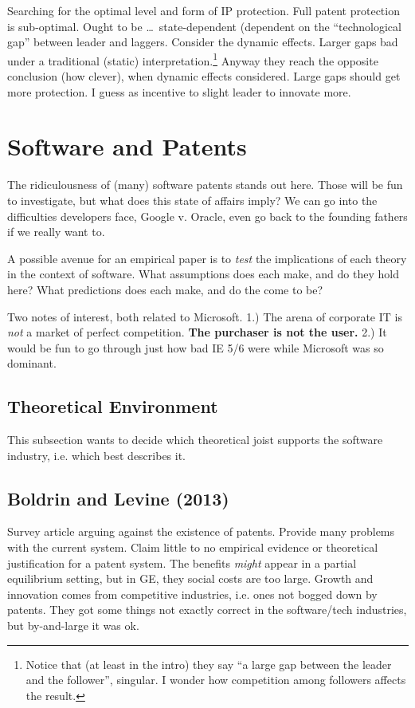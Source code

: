 \documentclass[11pt]{article}
\begin{document}
Searching for the optimal level and form of IP protection.  Full patent protection is sub-optimal.  Ought to be \ldots\ state-dependent (dependent on the ``technological gap'' between leader and laggers.  Consider the dynamic effects.  Larger gaps bad under a traditional (static) interpretation.\footnote{Notice that (at least in the intro) they say ``a large gap between the leader and the follower'', singular.  I wonder how competition among followers affects the result.}  Anyway they reach the opposite conclusion (how clever), when dynamic effects considered.  Large gaps should get more protection.  I guess as incentive to slight leader to innovate more.



\section{Software and Patents}
\label{sec:software_and_patents}

The ridiculousness of (many) software patents stands out here.  Those will be fun to investigate, but what does this state of affairs imply?  We can go into the difficulties developers face, Google v. Oracle, even go back to the founding fathers if we really want to.

A possible avenue for an empirical paper is to \emph{test} the implications of each theory in the context of software.  What assumptions does each make, and do they hold here?  What predictions does each make, and do the come to be?

Two notes of interest, both related to Microsoft. 1.) The arena of corporate IT is \emph{not} a market of perfect competition.  \textbf{The purchaser is not the user.} 2.) It would be fun to go through just how bad IE 5/6 were while Microsoft was so dominant.


\subsection{Theoretical Environment}
\label{sub:theoretical_environment}
  This subsection wants to decide which theoretical joist supports the software industry, i.e.  which best describes it.


\subsection{Boldrin and Levine (2013)}
\label{sub:boldrin_and_levine_}

  Survey article arguing against the existence of patents.  Provide many problems with the current system.  Claim little to no empirical evidence or theoretical justification for a patent system.  The benefits \emph{might} appear in a partial equilibrium setting, but in GE, they social costs are too large.  Growth and innovation comes from competitive industries, i.e. ones not bogged down by patents.  They got some things not exactly correct in the software/tech industries, but by-and-large it was ok.
\end{document}

